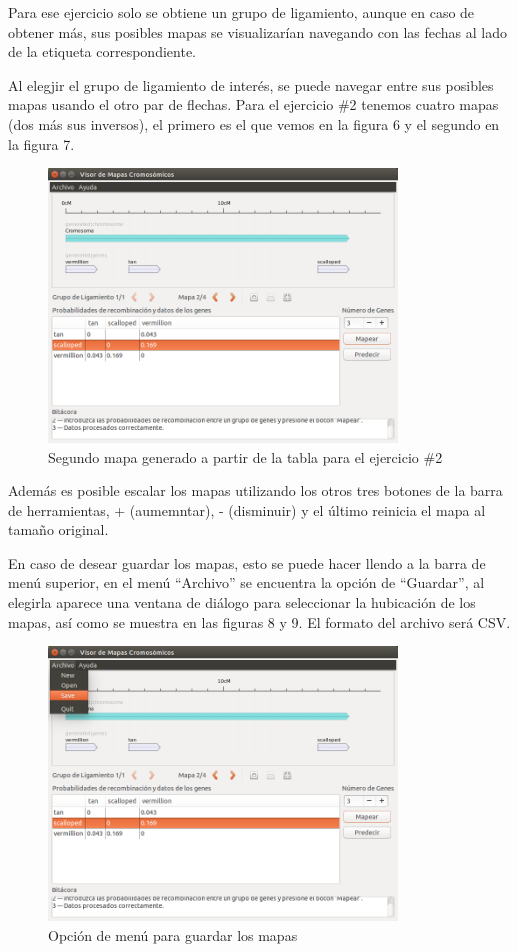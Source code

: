 \documentclass{article}
\begin{document}
	Para ese ejercicio solo se obtiene un grupo de ligamiento, aunque en caso de obtener más, sus posibles mapas se visualizarían navegando con las fechas al lado de la etiqueta correspondiente.
	
	Al elegjir el grupo de ligamiento de interés, se puede navegar entre sus posibles mapas usando el otro par de flechas. Para el ejercicio \#2 tenemos cuatro mapas (dos más sus inversos), el primero es el que vemos en la figura 6 y el segundo en la figura 7.
	
	\begin{figure}[h!]
		\centering
			\includegraphics[width=350px, keepaspectratio=false]{report4}
				\caption{Segundo mapa generado a partir de la tabla para el ejercicio \#2}
	\end{figure}
	
	Además es posible escalar los mapas utilizando los otros tres botones de la barra de herramientas, + (aumemntar), - (disminuir) y el último reinicia el mapa al tamaño original.
	
	En caso de desear guardar los mapas, esto se puede hacer llendo a la barra de menú superior, en el menú ``Archivo'' se encuentra la opción de ``Guardar'', al elegirla aparece una ventana de diálogo para seleccionar la hubicación de los mapas, así como se muestra en las figuras 8 y 9. El formato del archivo será CSV.
	
	\begin{figure}[h!]
		\centering
			\includegraphics[width=350px, keepaspectratio=false]{report5}
				\caption{Opción de menú para guardar los mapas}
	\end{figure}
	
\end{document}
